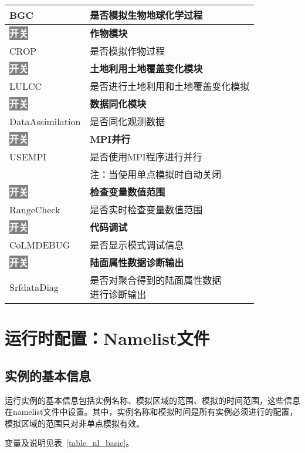 \documentclass[a4paper,12pt,twoside]{article}
\begin{document}
{\begin{longtable}{ll}
BGC &  是否模拟生物地球化学过程 \\
\hline
\colorbox{gray}{\textcolor{white}{\bf{开关}}} & \bf{作物模块} \\
CROP &  是否模拟作物过程 \\
\hline
\colorbox{gray}{\textcolor{white}{\bf{开关}}} & \bf{土地利用土地覆盖变化模块} \\
LULCC &  是否进行土地利用和土地覆盖变化模拟 \\
\hline
\colorbox{gray}{\textcolor{white}{\bf{开关}}} & \bf{数据同化模块} \\
DataAssimilation &  是否同化观测数据 \\
\hline
\colorbox{gray}{\textcolor{white}{\bf{开关}}} & \bf{MPI并行} \\
USEMPI &  是否使用MPI程序进行并行 \\
 & 注：当使用单点模拟时自动关闭 \\
\hline
\colorbox{gray}{\textcolor{white}{\bf{开关}}} & \bf{检查变量数值范围} \\
RangeCheck &  是否实时检查变量数值范围 \\
\hline
\colorbox{gray}{\textcolor{white}{\bf{开关}}} & \bf{代码调试} \\
CoLMDEBUG &  是否显示模式调试信息 \\
\hline
\colorbox{gray}{\textcolor{white}{\bf{开关}}} & \bf{陆面属性数据诊断输出} \\
SrfdataDiag &  \makecell[l]{是否对聚合得到的陆面属性数据\\进行诊断输出} \\

\end{longtable}}

\section{运行时配置：Namelist文件}\label{nml}

\subsection{实例的基本信息}
运行实例的基本信息包括实例名称、模拟区域的范围、模拟的时间范围，这些信息在namelist文件中设置。其中，实例名称和模拟时间是所有实例必须进行的配置，模拟区域的范围只对非单点模拟有效。

变量及说明见表~\ref{table_nl_basic}。
\end{document}
